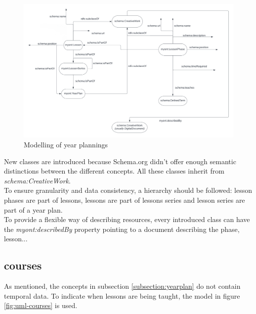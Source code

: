 \documentclass[12pt,journal]{IEEEtran}
\begin{document}
\begin{figure}[h]
    \caption{Modelling of year plannings}
    \label{fig:uml-lesson}
    \includegraphics[scale=0.3]{uml-lessons.png}
\end{figure}
\noindent New classes are introduced because Schema.org didn't offer enough semantic distinctions between the different concepts.
All these classes inherit from \textit{schema:CreativeWork}.\\
To ensure granularity and data consistency, a hierarchy should be followed: lesson phases are part of lessons, lessons are part of lessons series and lesson series are part of a year plan.\\
To provide a flexible way of describing resources, every introduced class can have the \textit{myont:describedBy} property pointing to a document describing the phase, lesson...

\subsection{courses}
\noindent As mentioned, the concepts in subsection \ref{subsection:yearplan} do not contain temporal data.
To indicate when lessons are being taught, the model in figure \ref{fig:uml-courses} is used.
\end{document}
